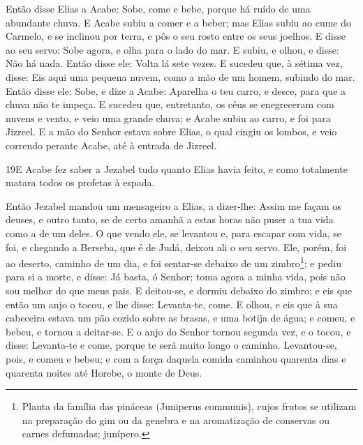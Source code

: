 Então disse Elias a Acabe: Sobe, come e bebe, porque há ruído de
uma abundante chuva. E Acabe subiu a comer e a beber; mas
Elias subiu ao cume do Carmelo, e se inclinou por terra, e pôs o seu
rosto entre os seus joelhos. E disse ao seu servo: Sobe
agora, e olha para o lado do mar. E subiu, e olhou, e disse: Não há
nada. Então disse ele: Volta lá sete vezes. E sucedeu que, à
sétima vez, disse: Eis aqui uma pequena nuvem, como a mão de um
homem, subindo do mar. Então disse ele: Sobe, e dize a Acabe:
Aparelha o teu carro, e desce, para que a chuva não te impeça.
E sucedeu que, entretanto, os céus se enegreceram com nuvens
e vento, e veio uma grande chuva; e Acabe subiu ao carro, e foi para
Jizreel. E a mão do Senhor estava sobre Elias, o qual cingiu
os lombos, e veio correndo perante Acabe, até à entrada de Jizreel.

\medskip

\lettrine{19} E Acabe fez saber a Jezabel tudo quanto Elias
havia feito, e como totalmente matara todos os profetas à espada.

Então Jezabel mandou um mensageiro a Elias, a dizer-lhe: Assim me
façam os deuses, e outro tanto, se de certo amanhã a estas horas não
puser a tua vida como a de um deles. O que vendo ele, se
levantou e, para escapar com vida, se foi, e chegando a Berseba, que
é de Judá, deixou ali o seu servo. Ele, porém, foi ao deserto,
caminho de um dia, e foi sentar-se debaixo de um
zimbro\footnote{Planta da família das pináceas (Juniperus communis),
cujos frutos se utilizam na preparação do gim ou da genebra e na
aromatização de conservas ou carnes defumadas; junípero.}; e pediu
para si a morte, e disse: Já basta, ó Senhor; toma agora a minha
vida, pois não sou melhor do que meus pais. E deitou-se, e
dormiu debaixo do zimbro; e eis que então um anjo o tocou, e lhe
disse: Levanta-te, come. E olhou, e eis que à sua cabeceira
estava um pão cozido sobre as brasas, e uma botija de água; e comeu,
e bebeu, e tornou a deitar-se. E o anjo do Senhor tornou segunda
vez, e o tocou, e disse: Levanta-te e come, porque te será muito
longo o caminho. Levantou-se, pois, e comeu e bebeu; e com a
força daquela comida caminhou quarenta dias e quarenta noites até
Horebe, o monte de Deus.

